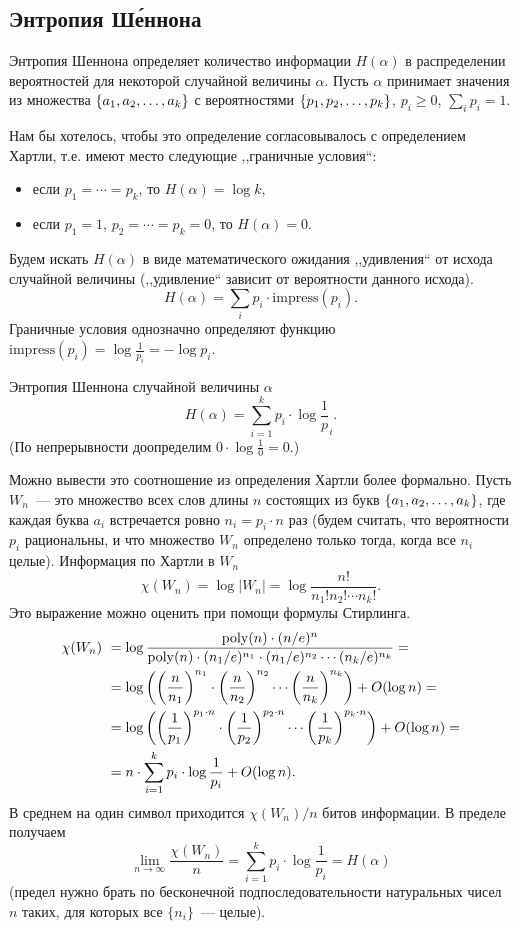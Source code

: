 \documentclass[12pt]{article}
\begin{document}
\subsection{Энтропия Ш\'{е}ннона}

Энтропия Шеннона определяет количество информации \(H(\alpha)\) в распределении
вероятностей для некоторой случайной величины \(\alpha\).  Пусть \(\alpha\)
принимает значения из множества \(\{{a}_1,{a}_2,\dotsc,{a}_{k}\}\) с вероятностями
\(\{{p}_1,{p}_2,\dotsc,{p}_{k}\}\), \(p_i\ge 0 \), \(\sum_ip_i=1\).

Нам бы хотелось, чтобы это определение согласовывалось с определением Хартли, т.е. имеют место следующие ,,граничные условия``:
\begin{itemize}
\item если \(p_1=\dotsb=p_k\), то \(H(\alpha) = \log k\),
\item если \(p_1=1\), \(p_2=\dotsb=p_k=0\), то \(H(\alpha) = 0\).
\end{itemize}
Будем искать \(H(\alpha)\) в виде математического ожидания ,,удивления`` от исхода случайной величины (,,удивление`` зависит от вероятности данного исхода).
\[H(\alpha) = \sum_i p_i\cdot \mathrm{impress}(p_i).\]
Граничные условия однозначно определяют функцию \(\mathrm{impress}(p_i) = \log\frac{1}{p_i} = -\log p_i\).
\begin{definition}[1948]
Энтропия Шеннона случайной величины \(\alpha\) 
\[
H(\alpha) = \sum_{i=1}^k p_i\cdot\log\frac1p_i.
\]
(По непрерывности доопределим \(0\cdot \log\frac10 = 0\).)
\end{definition}

Можно вывести это соотношение из определения Хартли более формально. 
Пусть $W_n$~--- это множество всех слов длины $n$ состоящих из букв $\{{a}_1,{a}_2,\dotsc,{a}_{k}\}$,
где каждая буква $a_i$ встречается ровно $n_i = p_i\cdot n$ раз
(будем считать, что вероятности $p_i$ рациональны, и что множество 
$W_n$ определено только тогда, когда все $n_i$ целые).
Информация по Хартли в $W_n$ 
\[
    \chi(W_n) = \log |W_n| = \log \frac{n!}{n_1!n_2!\dotsb n_k!}.
\]
Это выражение можно оценить при помощи формулы Стирлинга.
\[
    \begin{aligned}
    \chi(W_n)&\ =  \log \frac{\mathrm{poly}(n)\cdot (n/e)^n}
    {\mathrm{poly}(n)\cdot(n_1/e)^{n_1}\cdot(n_1/e)^{n_2}\dotsm(n_k/e)^{n_k}} =\\
    &\ = \log \left(\left(\frac{n}{n_1}\right)^{n_1}\cdot
                    \left(\frac{n}{n_2}\right)^{n_2}\dotsm
                    \left(\frac{n}{n_k}\right)^{n_k}\right) + O(\log n) =\\
    &\ = \log \left(\left(\frac{1}{p_1}\right)^{p_1\cdot n}\cdot
                    \left(\frac{1}{p_2}\right)^{p_2\cdot n}\dotsm
                    \left(\frac{1}{p_k}\right)^{p_k\cdot n}\right) + O(\log n) =\\
    &\ = n \cdot \sum_{i=1}^k p_i \cdot \log\frac{1}{p_i} + O(\log n).
    \end{aligned}
\]
В среднем на один символ приходится $\chi(W_n)/n$ битов информации.
В пределе получаем
\[
    \lim_{n\to \infty}\frac{\chi(W_n)}{n} = \sum_{i=1}^k p_i \cdot \log\frac{1}{p_i} = H(\alpha)
\]
(предел нужно брать по бесконечной подпоследовательности натуральных чисел $n$ таких,
для которых все $\{n_i\}$~--- целые).
 
\end{document}
